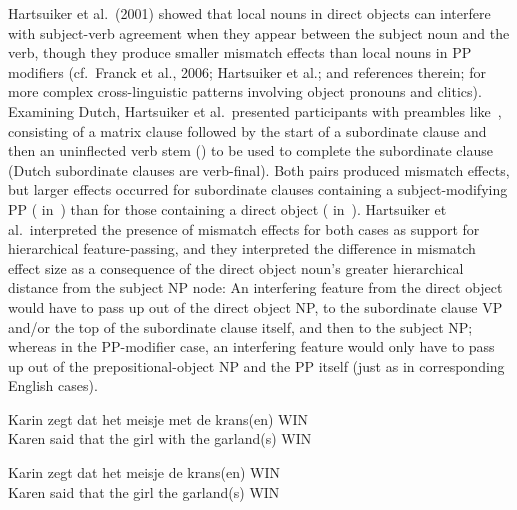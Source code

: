\documentclass[12pt,titlepage]{article}
\newcommand{\IGNORE}[1]{} %
\begin{document}
Hartsuiker et al.\ (2001) showed that local nouns in direct objects can
interfere with subject-verb agreement when they appear between the subject
noun and the verb, though they produce smaller mismatch effects than local
nouns in PP modifiers (cf.\ Franck et al., 2006; Hartsuiker et al.; and
references therein\IGNORE{ it would make sense to cite Ant\'on-M\'endez 96
directly here, but don't have it}; for more complex cross-linguistic
patterns involving object pronouns and clitics).  Examining Dutch,
Hartsuiker et al.\ presented participants with preambles
like~, consisting of a matrix clause followed by the start of
a subordinate clause and then an uninflected verb stem () to be
used to complete the subordinate clause (Dutch subordinate clauses are
verb-final).  Both pairs produced mismatch effects, but larger effects
occurred for subordinate clauses containing a subject-modifying PP
( in~) than for those containing a
direct object ( in~).  Hartsuiker et al.\
interpreted the presence of mismatch effects for both cases as support for
hierarchical feature-passing, and they interpreted the difference in
mismatch effect size as a consequence of the direct object noun's greater
hierarchical distance from the subject NP node: An interfering feature from
the direct object would have to pass up out of the direct object NP, to the
subordinate clause VP and/or the top of the subordinate clause itself, and
then to the subject NP; whereas in the PP-modifier case, an interfering
feature would only have to pass up out of the prepositional-object NP and
the PP itself (just as in corresponding English cases).

\begin{myexample}
\label{hetal}
\begin{examples}
    
    \item \label{hetal-sm} Karin zegt dat het meisje met de krans(en) 
    \hfill WIN \hspace{14em} \\
    Karen said that the girl with the garland(s) \hfill WIN \hspace{14em} 

    \item \label{hetal-do} Karin zegt dat het meisje de krans(en) 
    \hfill WIN \hspace{14em} \\
    Karen said that the girl the garland(s) \hfill WIN \hspace{14em} 
        
\end{examples}
\end{myexample}
\end{document}
